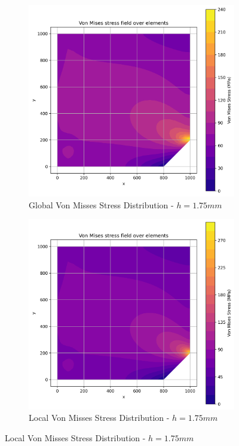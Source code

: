\begin{figure}[H]
  \centering
  \begin{subfigure}[b]{0.45\textwidth}
    \centering
    \includegraphics[width=\textwidth]{GRAFICOS/Quad9/1.75mm_global/resultados_von_mises.png}
    \caption{Global Von Misses Stress Distribution - $h=1.75mm$}
    \label{fig:img11}
  \end{subfigure}
  \hfill
  \begin{subfigure}[b]{0.45\textwidth}
    \centering
    \includegraphics[width=\textwidth]{GRAFICOS/Quad9/1.75mm_local/resultados_von_mises.png}
    \caption{Local Von Misses Stress Distribution - $h=1.75mm$}
    \label{fig:img21}
  \end{subfigure}
\end{figure}

